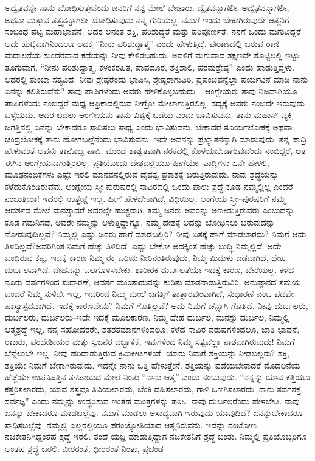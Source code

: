 ಅದ್ವೈತವನ್ನೇ ನಾನು ಬೋಧಿಸುತ್ತೇನೆಂದು ಜನರಿಗೆ ನನ್ನ ಮೇಲೆ ಬೇಜಾರು. ದ್ವೈತವನ್ನಾಗಲೀ, ಅದ್ವೈತವನ್ನಾಗಲೀ, ಅಥವಾ ಮತ್ತಾವ ತತ್ತ್ವವನ್ನಾಗಲೀ ಬೋಧಿಸುವುದು ನನ್ನ ಗುರಿಯಲ್ಲ. ನಮಗೆ ಇಂದು ಬೇಕಾಗಿರುವುದೇ ಆತ್ಮನಿಗೆ ಸಂಬಂಧ ಪಟ್ಟ ಮಹಾಭಾವನೆ, ಅದರ ಅನಂತ ಶಕ್ತಿ, ಪರಿಶುದ್ಧತೆ ಮತ್ತು ಪರಿಪೂರ್ಣತೆ. ನನಗೆ ಒಂದು ಮಗುವಿದ್ದರೆ ಅದು ಹುಟ್ಟಿದಾಗಿನಿಂದಲೂ ಅದಕ್ಕೆ “ನೀನು ಪರಿಶುದ್ಧಾತ್ಮ” ಎಂದು ಹೇಳುತ್ತಿದ್ದೆ. ಪುರಾಣದಲ್ಲಿ ಬರುವ ರಾಣಿ ಮದಾಲಸೆಯ ಸುಂದರವಾದ ಕಥೆಯನ್ನು ನೀವು ಕೇಳಿರಬಹುದು. ಅವಳಿಗೆ ಮಗುವಾದ ತಕ್ಷಣವೇ ತೊಟ್ಟಿಲಲ್ಲಿ ಇಟ್ಟು ತೂಗುವಾಗ, “ನೀನು ಪರಿಶುದ್ದಾತ್ಮ, ಕಳಂಕರಹಿತ, ಪಾಪದೂರ, ಶಕ್ತಿಶಾಲಿ, ಪರಮಶ್ರೇಷ್ಠ” ಎಂದು ಹಾಡುತ್ತಿದ್ದಳು. ಅದರಲ್ಲಿ ತುಂಬಾ ಸತ್ಯವಿದೆ. ನೀವು ಶ್ರೇಷ್ಠರೆಂದು ಭಾವಿಸಿ, ಶ್ರೇಷ್ಠರಾಗುವಿರಿ. ಪ್ರಪಂಚವನ್ನೆಲ್ಲಾ ಪರ್ಯಟನೆ ಮಾಡಿ ನಾನು ಏನನ್ನು ಕಲಿತಿರುವೆನು? ತಾವು ಪಾಪಿಗಳೆಂದು ಅವರು ಹೇಳಿಕೊಳ್ಳಬಹುದು – ಆಂಗ್ಲೇಯರು ತಾವು ನಿಜವಾಗಿಯೂ ಪಾಪಿಗಳೆಂದು ನಂಬಿದ್ದರೆ ಮಧ್ಯ ಆಫ್ರಿಕಾದಲ್ಲಿರುವ ನೀಗ್ರೋ ಮೇಲಾಗುತ್ತಿರಲಿಲ್ಲ. ಸದ್ಯಕ್ಕೆ ಅವರು ನಂಬದೇ ಇರುವುದು ಒಳ್ಳೆಯದು. ಅದರ ಬದಲು ಆಂಗ್ಲೇಯನು ತಾನು ವಿಶ್ವಕ್ಕೆ ಒಡೆಯ ಎಂದು ಭಾವಿಸುವನು. ತಾನು ಮಹಾನ್​ ವ್ಯಕ್ತಿ ಜಗತ್ತಿನಲ್ಲಿ ಏನನ್ನು ಬೇಕಾದರೂ ಸಾಧಿಸಲು ಸಾಧ್ಯ ಎಂದು ಭಾವಿಸುವನು. ಬೇಕಾದರೆ ಸೂರ್ಯಲೋಕಕ್ಕೆ ಅಥವಾ ಚಂದ್ರಲೋಕಕ್ಕೆ ತಾನು ಹೋಗಬಲ್ಲೆನೆಂದು ಭಾವಿಸುವನು. ಇದೇ ಅವನನ್ನು ಪ್ರಖ್ಯಾತನನ್ನಾಗಿ ಮಾಡುವುದು. ತನ್ನ ಪಾದ್ರಿ ಹೇಳುವಂತೆ ಆವನು ತಾನೊಬ್ಬ ಪಾಪಿ, ಮುಂದೆ ಶಾಶ್ವತವಾಗಿ ನರಕದಲ್ಲಿ ಕೊಳೆಯಬೇಕಾಗುವುದೆಂದು ನಂಬಿದ್ದರೆ, ಆತ ಈಗಿನ ಆಂಗ್ಲೇಯ\-ನಾಗುತ್ತಿರಲಿಲ್ಲ. ಪ್ರತಿಯೊಂದು ದೇಶದಲ್ಲಿಯೂ ಹೀಗೆಯೇ. ಪಾದ್ರಿಗಳು ಏನೇ ಹೇಳಲಿ, ಮೂಢನಂಬಿಕೆಗಳು ಎಷ್ಟೇ ಇರಲಿ ಮಾನವನಲ್ಲಿರುವ ದೈವತ್ವ ಪ್ರಕಾಶಕ್ಕೆ ಬರುತ್ತಿರುವುದು. ನಾವು ಶ್ರದ್ಧೆಯನ್ನು ಕಳೆದುಕೊಂಡಿರುವೆವು. ಆಂಗ್ಲೇಯ ಸ್ತ್ರೀ ಪುರುಷರಲ್ಲಿ ಸಾವಿರದಲ್ಲಿ ಒಂದು ಪಾಲು ಶ್ರದ್ಧೆ ಕೂಡ ನಮ್ಮಲ್ಲಿಲ್ಲ ಎಂದರೆ ನಂಬುತ್ತೀರಾ! ಇದರಲ್ಲಿ ಉತ್ಪ್ರೇಕ್ಷೆ ಇಲ್ಲ. ಹೀಗೆ ಹೇಳಬೇಕಾಗಿದೆ, ವಿಧಿಯಿಲ್ಲ. ಆಂಗ್ಲೇಯ ಸ್ತ್ರೀ–ಪುರಷರಿಗೆ ನಮ್ಮ ಆದರ್ಶದ ಮೇಲೆ ಮನಸ್ಸಾದರೆ ಅದರಲ್ಲೇ ಹುಚ್ಚರಾಗಿ, ತಮ್ಮ ಜನರು ಅವರನ್ನು ಅಣಕಿಸುತ್ತಿರುವರು ಎಂಬುದನ್ನು ಕೂಡ ಗಮನಿಸದೆ, ಅವರೇ ನಮ್ಮನ್ನು ಆಳುತ್ತಿದ್ದಾಗ್ಯೂ, ನಮ್ಮ ದೇಶಕ್ಕೆ ಅದನ್ನು ಬೋಧಿಸಲು ಬರುವುದನ್ನು ನೋಡುವುದಿಲ್ಲವೆ? ನಿಮ್ಮಲ್ಲಿ ಎಷ್ಟು ಜನರು ಹಾಗೆ ಮಾಡಬಲ್ಲಿರಿ? ನೀವು ಏತಕ್ಕೆ ಹಾಗೆ ಮಾಡಬಾರದು? ನಿಮಗೆ ಆದು ತಿಳಿದಿಲ್ಲವೆ?\break ಅವರಿಗಿಂತ ನಿಮಗೆ ಹೆಚ್ಚು ತಿಳಿದಿದೆ. ಎಷ್ಟು ಬೇಕೋ ಅದಕ್ಕಿಂತ ಹೆಚ್ಚು ಬುದ್ಧಿ ನಿಮ್ಮಲ್ಲಿದೆ. ಅದೇ ಬಂದಿರುವ ಕಷ್ಟ. ಇದಕ್ಕೆ ಕಾರಣ ನಿಮ್ಮ ರಕ್ತ ಬರಿಯ ನೀರಿನಂತಿರುವುದು, ನಿಮ್ಮ ಮಿದುಳು ಜಡವಾಗಿದೆ, ದೇಹ ದುರ್ಬಲವಾಗಿದೆ. ದೇಹವನ್ನು ಬಲಗೊಳಿಸಬೇಕು. ಶಾರೀರಕ ದುರ್ಬಲತೆಯೇ ಇದಕ್ಕೆ ಕಾರಣ, ಬೇರೆಯಲ್ಲ. ಕಳೆದ ನೂರು ವರ್ಷಗಳಿಂದ ಸುಧಾರಣೆ, ಆದರ್ಶ ಮುಂತಾದುವನ್ನು ಕುರಿತು ಮಾತನಾಡುತ್ತಿರುವಿರಿ. ಅನುಷ್ಠಾನದ ಸಮಯ ಬಂದರೆ ನಿಮ್ಮ ಸುಳಿವೇ ಇಲ್ಲ. ಇದರಿಂದ ನಿಮ್ಮ ಮೇಲೆ ಜಗತ್ತಿಗೆ ತಾತ್ಸಾರವುಂಟಾಗಿದೆ, ಸುಧಾರಣೆ ಎಂಬ ಪದವೇ ಹಾಸ್ಯಾಸ್ಪದವಾಗಿದೆ. ಇದಕ್ಕೆ ಕಾರಣವೇನು? ನಿಮಗೆ ಗೊತ್ತಿಲ್ಲವೆ? ಅದು ನಿಮಗೆ ಚೆನ್ನಾಗಿ ಗೊತ್ತಿದೆ. ನೀವು ದುರ್ಬಲರು, ದುರ್ಬಲರು, ದುರ್ಬಲರು–ಇದೇ ಇದಕ್ಕೆ ಮೂಲಕಾರಣ. ನಿಮ್ಮ ದೇಹ ದುರ್ಬಲ, ಮನಸ್ಸು ದುರ್ಬಲ, ನಿಮ್ಮಲ್ಲಿ ಆತ್ಮಶ್ರದ್ಧೆ ಇಲ್ಲ. ನನ್ನ ಸಹೋದರರೇ, ಶತಶತಮಾನಗಳಿಂದಲೂ, ಕಳೆದ ಸಾವಿರ ವರುಷಗಳಿಂದಲೂ, ಜಾತಿ ಭಾವನೆ, ರಾಜರು, ಪರದೇಶೀಯರ ಮತ್ತು ಸ್ವಜನರ ದಬ್ಬಾಳಿಕೆ, ಇವುಗಳಿಂದ ನಿಮ್ಮ ಸತ್ವವೆಲ್ಲಾ ನಾಶವಾಗಿರುವುದು! ನಿಮಗೆ ಬೆನ್ನೆಲುಬೇ ಇಲ್ಲ. ನೀವು ಹರಿದಾಡುತ್ತಿರುವ ಕ್ರಿಮಿಕೀಟಗಳಂತೆ. ಯಾರು ನಿಮಗೆ ಶಕ್ತಿಯನ್ನು ನೀಡಬಲ್ಲರು? ಶಕ್ತಿ, ಶಕ್ತಿಯೇ ನಿಮಗೆ ಬೇಕಾಗಿರುವುದು. ಇದನ್ನೇ ನಾನು ಒತ್ತಿ ಹೇಳುತ್ತೇನೆ. ಶಕ್ತಿಯನ್ನು ಪಡೆಯಬೇಕಾದರೆ ಮೊದಲನೆಯ ಹೆಜ್ಜೆಯೇ ಉಪನಿಷತ್ತಿನ ತಳಪಾಯದ ಮೇಲೆ ನಿಂತು “ನಾನು ಆತ್ಮ” ಎಂದು ನಂಬುವುದು. “ನನ್ನನ್ನು ಯಾವ ಕತ್ತಿಯೂ ಕತ್ತರಿಸಲಾರದು, ಯಾವ ಶಸ್ತ್ರವೂ ತಿವಿಯಲಾರದು, ಬೆಂಕಿ ದಹಿಸ\-ಲಾರದು, ಗಾಳಿ ಒಣಗಿಸಲಾರದು. ನಾನು ಸರ್ವಶಕ್ತ, ಸರ್ವಜ್ಞ” ಎಂದು ನಮ್ಮನ್ನು ಉದ್ಧರಿಸುವ ಇಂತಹ ಮಂತ್ರಗಳನ್ನು ಪಠಿಸಿ. ನಾವು ದುರ್ಬಲರೆಂದು ಹೇಳಬೇಡಿ. ನಾವು ಏನನ್ನು ಬೇಕಾದರೂ ಮಾಡಬಲ್ಲೆವು. ನಮಗೆ ಮಾಡಲು ಅಸಾಧ್ಯವಾಗಿ ಇರುವುದು ಯಾವುದಿದೆ? ಏನನ್ನುಬೇಕಾದರೂ ಸಾಧಿಸಬಲ್ಲೆವು. ನಮ್ಮಲ್ಲಿ ಎಲ್ಲರಲ್ಲಿಯೂ ಪರಂಜ್ಯೋತಿಯಾದ ಆತ್ಮನಿರುವನು. ಇದನ್ನು ನಂಬೋಣ. ನಚಿಕೇತನಿಗಿದ್ದಂತಹ ಶ್ರದ್ಧೆ ಇರಲಿ. ತಂದೆ ಯಜ್ಞ ಮಾಡುತ್ತಿದ್ದಾಗ ನಚಿಕೇತನಿಗೆ ಶ್ರದ್ಧೆ ಬಂತು. ನಿಮ್ಮಲ್ಲಿ ಪ್ರತಿಯೊಬ್ಬರಿಗೂ ಅಂತಹ ಶ್ರದ್ಧೆ ಬರಲಿ. ವೀರರಂತೆ, ಧೀರರಂತೆ ನಿಂತು, ಪ್ರಚಂಡ\break 